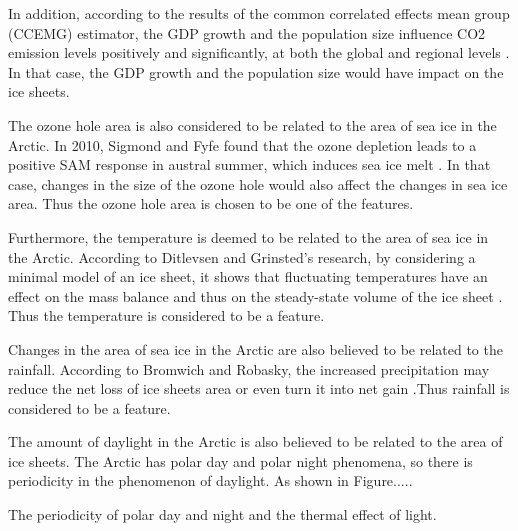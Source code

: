 In addition, according to the results of the common correlated effects mean group (CCEMG) estimator, the GDP growth and the population size influence CO2 emission levels positively and significantly, at both the global and regional levels \cite{DONG2018180}. In that case, the GDP growth and the population size would have impact on the ice sheets.

The ozone hole area is also considered to be related to the area of sea ice in the Arctic. In 2010, Sigmond and Fyfe found that the ozone depletion leads to a positive SAM response in austral summer, which induces sea ice melt \cite{sigmond2010has}. In that case, changes in the size of the ozone hole would also affect the changes in sea ice area. Thus the ozone hole area is chosen to be one of the features.

Furthermore, the temperature is deemed to be related to the area of sea ice in the Arctic. According to Ditlevsen and Grinsted's research, by considering a minimal model of an ice sheet, it shows that fluctuating temperatures have an effect on the mass balance and thus on the steady-state volume of the ice sheet \cite{mikkelsen2018influence}. Thus the temperature is considered to be a feature.

Changes in the area of sea ice in the Arctic are also believed to be related to the rainfall. According to Bromwich and Robasky, the increased precipitation may reduce the net loss of ice sheets area or even turn it into net gain \cite{Bromwich1993RecentPT}.Thus rainfall is considered to be a feature.

The amount of daylight in the Arctic is also believed to be related to the area of ice sheets. The Arctic has polar day and polar night phenomena, so there is periodicity in the phenomenon of daylight. As shown in Figure.....



The periodicity of polar day and night and the thermal effect of light.

